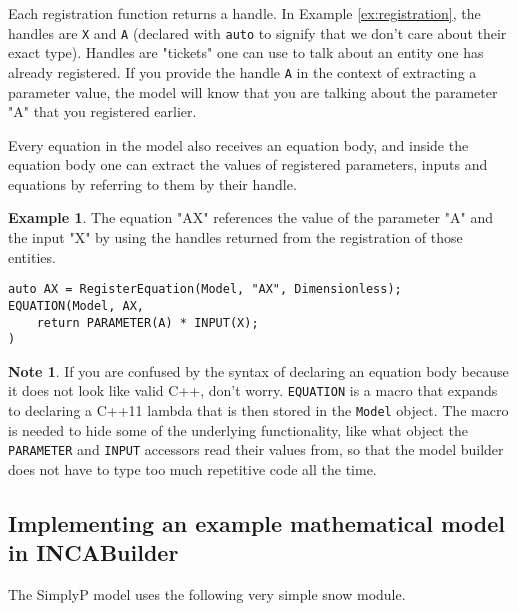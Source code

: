 \documentclass[11pt]{article}
\theoremstyle{definition}
\newtheorem{mynote}{Note}
\newenvironment{note}%
  {\begin{lrbox}{\notebox}%
   \begin{minipage}{\dimexpr\linewidth-2\fboxsep}
   \begin{mynote}}%
  {\end{mynote}%
   \end{minipage}%
   \end{lrbox}%
   \begin{trivlist}
     \item[]\colorbox{silver}{\usebox\notebox}
   \end{trivlist}}
\newtheorem{myexample}{Example}
\newenvironment{example}%
  {\begin{lrbox}{\examplebox}%
   \begin{minipage}{\dimexpr\linewidth-2\fboxsep}
   \begin{myexample}}%
  {\end{myexample}%
   \end{minipage}%
   \end{lrbox}%
   \begin{trivlist}
     \item[]\colorbox{silver}{\usebox\examplebox}
   \end{trivlist}}
\begin{document}
Each registration function returns a handle. In Example \ref{ex:registration}, the handles are {\tt X} and {\tt A} (declared with {\tt auto} to signify that we don't care about their exact type). Handles are "tickets" one can use to talk about an entity one has already registered. If you provide the handle {\tt A} in the context of extracting a parameter value, the model will know that you are talking about the parameter "A" that you registered earlier.

Every equation in the model also receives an equation body, and inside the equation body one can extract the values of registered parameters, inputs and equations by referring to them by their handle.

\begin{example}\label{ex:equation}
The equation "AX" references the value of the parameter "A" and the input "X" by using the handles returned from the registration of those entities.
\begin{lstlisting}[style=mycpp]
auto AX = RegisterEquation(Model, "AX", Dimensionless);
EQUATION(Model, AX,
	return PARAMETER(A) * INPUT(X);
)
\end{lstlisting}
\end{example}

\begin{note}
If you are confused by the syntax of declaring an equation body because it does not look like valid C++, don't worry. {\tt EQUATION} is a macro that expands to declaring a C++11 lambda that is then stored in the {\tt Model} object. The macro is needed to hide some of the underlying functionality, like what object the {\tt PARAMETER} and {\tt INPUT} accessors read their values from, so that the model builder does not have to type too much repetitive code all the time.
\end{note}

\subsection{Implementing an example mathematical model in INCABuilder}

The SimplyP model \cite{jackson-blake17} uses the following very simple snow module.
\end{document}
